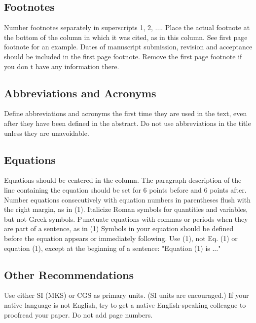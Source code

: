 \documentclass{article}
\begin{document}
\subsection{Footnotes}
Number footnotes separately in superscripts 1, 2, .... Place the actual footnote at the bottom of the column in which it was cited, as in this column. See first page footnote for an example. 
Dates of manuscript submission, revision and acceptance should be included in the first page footnote. Remove the first page footnote if you don t have any information there.
\subsection{Abbreviations and Acronyms}
Define abbreviations and acronyms the first time they are used in the text, even after they have been defined in the abstract. Do not use abbreviations in the title unless they are unavoidable.
\subsection{Equations}
Equations should be centered in the column. The paragraph description of the line containing the equation should be set for 6 points before and 6 points after. Number equations consecutively with equation numbers in parentheses flush with the right margin, as in (1). Italicize Roman symbols for quantities and variables, but not Greek symbols. Punctuate equations with commas or periods when they are part of a sentence, as in	(1)
Symbols in your equation should be defined before the equation appears or immediately following. Use  (1),  not  Eq. (1)  or  equation (1),  except at the beginning of a sentence: "Equation (1) is ..."


\subsection{Other Recommendations}
Use either SI (MKS) or CGS as primary units. (SI units are encouraged.) If your native language is not English, try to get a native English-speaking colleague to proofread your paper. Do not add page numbers.
\end{document}
